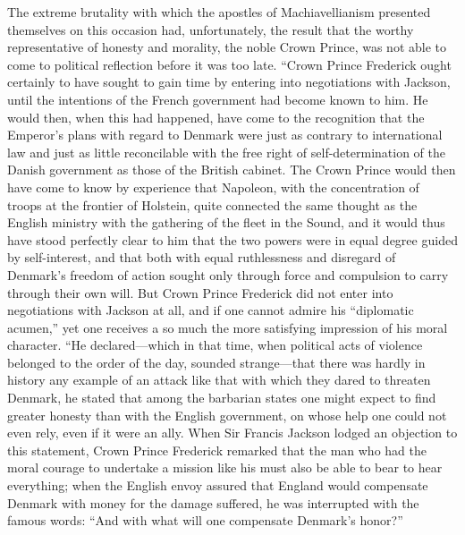 \documentclass[12pt,a4paper,openany]{book}
\newcommand{\opage}[1]{\marginnote{\footnotesize\textit{[#1]}}}
\begin{document}
The extreme brutality with which the apostles of Machiavellianism
presented themselves on this occasion
had, unfortunately, the result that the worthy representative of honesty
and morality, the noble Crown Prince, was
not able to come to political reflection before
it was too late. ``Crown Prince Frederick ought certainly
to have sought to gain time by entering into negotiations
with Jackson, until the intentions of the French government
had become known to him. He would then, when this
had happened, have come to the recognition that the Emperor's
plans with regard to Denmark were just as
contrary to international law and just as little reconcilable
with the free right of self-determination of the Danish government
as those of the British cabinet. The Crown Prince would then have
come to know by experience that Napoleon, with the concentration of troops
at the frontier of Holstein, quite connected the same
\setcounter{footnote}{0}%
\opage{100}thought as the English ministry with the gathering
of the fleet in the Sound, and it would thus have stood
perfectly clear to him that the two powers were in equal degree
guided by self-interest, and that both with equal
ruthlessness and disregard of Denmark's freedom of action
sought only through force and compulsion to carry through their
own will. But Crown Prince Frederick did not
enter into negotiations with Jackson at all, and if
one cannot admire his ``diplomatic acumen,'' yet
one receives a so much the more satisfying impression of his
moral character. ``He declared---which in
that time, when political acts of violence belonged to the order
of the day, sounded strange---that there was hardly in history
any example of an attack like that with which
they dared to threaten Denmark, he stated that among
the barbarian states one might expect to find greater honesty
than with the English government, on whose help
one could not even rely, even if it were an ally.
When Sir Francis Jackson lodged an objection to
this statement, Crown Prince Frederick remarked that the
man who had the moral courage to undertake a
mission like his must also be able to bear to hear
everything; when the English envoy assured that England
would compensate Denmark with money for the damage suffered,
he was interrupted with the famous words: ``And
with what will one compensate Denmark's honor?''
\end{document}
